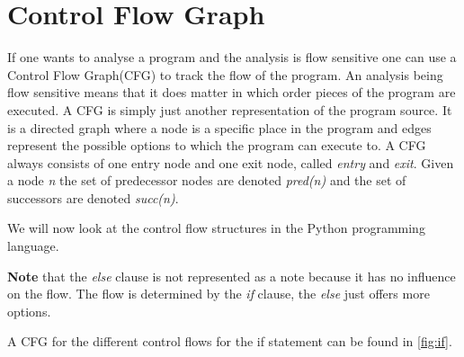 \section{Control Flow Graph}\label{control_flow_graph}
If one wants to analyse a program and the analysis is flow sensitive one can use a Control Flow Graph(CFG) to track the flow of the program.
An analysis being flow sensitive means that it does matter in which order pieces of the program are executed.
A CFG is simply just another representation of the program source.
It is a directed graph where a node is a specific place in the program and edges represent the possible options to which the program can execute to.
A CFG always consists of one entry node and one exit node, called \textit{entry} and \textit{exit}.
Given a node \textit{n} the set of predecessor nodes are denoted \textit{pred(n)} and the set of successors are denoted \textit{succ(n)}.

We will now look at the control flow structures in the Python programming language.

\textbf{Note} that the \textit{else} clause is not represented as a note because it has no influence on the flow.
The flow is determined by the \textit{if} clause, the \textit{else} just offers more options.


A CFG for the different control flows for the if statement can be found in \cref{fig:if}.


